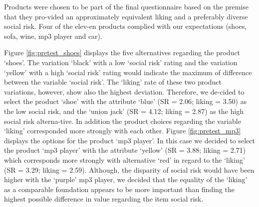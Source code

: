 Products were chosen to be part of the final questionnaire based on the premise that they pro-vided an approximately equivalent liking and a preferably diverse social risk. Four of the elev-en products complied with our expectations (shoes, sofa, wine, mp3 player and car). \par
Figure \ref{fig:pretest_shoes} displays the five alternatives regarding the product ‘shoes’. The variation ‘black’ with a low ‘social risk’ rating and the variation ‘yellow’ with a high ‘social risk’ rating would indicate the maximum of difference between the variable ‘social risk’. The ‘liking’ rate of these two product variations, however, show also the highest deviation. Therefore, we de-cided to select the product ‘shoe’ with the attribute ‘blue’ (SR = 2.06; liking = 3.50) as the low social risk, and the ‘union jack’ (SR =  4.12; liking = 2.87) as the high social risk alterna-tive. In addition the product choices regarding the variable ‘liking’ corresponded more strongly with each other. 
Figure \ref{fig:pretest_mp3} displays the options for the product ‘mp3 player’. In this case we decided to select the product ‘mp3 player’ with the attribute ‘yellow’ (SR = 3.88; liking = 2.71) which corresponds more strongly with alternative ‘red’ in regard to the ‘liking’ (SR =  3.29; liking = 2.59). Although, the disparity of social risk would have been higher with the ‘purple’ mp3 player, we decided that the equality of the ‘liking’ as a comparable foundation appears to be more important than finding the highest possible difference in value regarding the item social risk.
